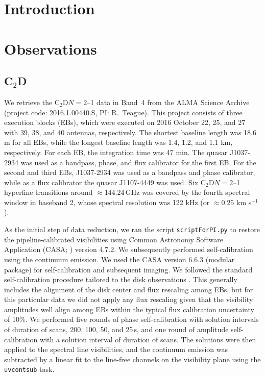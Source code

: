 \documentclass[linenumbers, twocolumn, times]{aastex631}
\newcommand{\CCD}{C$_2$D\xspace}
\begin{document}
\section{Introduction} \label{sec:intro}

\section{Observations} \label{sec:observation}
\subsection{\CCD}
We retrieve the \CCD $N=2$--1 data in Band~4 from the ALMA Science Archive (project code: 2016.1.00440.S, PI: R.\ Teague). This project consists of three execution blocks (EBs), which were executed on 2016 October 22, 25, and 27 with 39, 38, and 40 antennas, respectively. The shortest baseline length was 18.6 m for all EBs, while the longest baseline length was 1.4, 1.2, and 1.1 km, respectively. For each EB, the integration time was 47 min. The quasar J1037-2934 was used as a bandpass, phase, and flux calibrator for the first EB. For the second and third EBs, J1037-2934 was used as a bandpass and phase calibrator, while as a flux calibrator the quasar J1107-4449 was used. Six \CCD $N=2$--1 hyperfine transitions around ${\approx}144.24$\,GHz was covered by the fourth spectral window in baseband 2, whose spectral resolution was 122 kHz (or ${\approx}0.25$ km s$^{-1}$). 

As the initial step of data reduction, we ran the script \texttt{scriptForPI.py} to restore the pipeline-calibrated visibilities using Common Astronomy Software Application (CASA; \citealt{CASA}) version 4.7.2. We subsequently performed self-calibration using the continuum emission. We used the CASA version 6.6.3 (modular package) for self-calibration and subsequent imaging. We followed the standard self-calibration procedure tailored to the disk observations \citep[e.g.,][]{Andrews2018, Oberg2021_MAPS, Ohashi2023}. This generally includes the alignment of the disk center and flux rescaling among EBs, but for this particular data we did not apply any flux rescaling given that the visibility amplitudes well align among EBs within the typical flux calibration uncertainty of 10\%. We performed five rounds of phase self-calibration with solution intervals of duration of scans, 200, 100, 50, and 25\,s, and one round of amplitude self-calibration with a solution interval of duration of scans. The solutions were then applied to the spectral line visibilities, and the continuum emission was subtracted by a linear fit to the line-free channels on the visibility plane using the \texttt{uvcontsub} task. 
\end{document}
